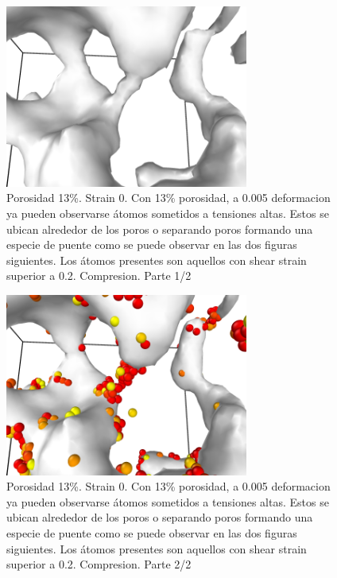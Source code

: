 \documentclass[10pt, oneside]{article} %
\begin{document}
\begin{figure}[H]
\centering
\includegraphics[width=8cm]{Figures/Porosidad/porosidad_13_0_puente.png}
\caption{Porosidad 13\%. Strain 0. Con 13\% porosidad, a 0.005 deformacion ya pueden observarse átomos sometidos a tensiones altas. Estos se ubican alrededor de los poros o separando poros formando una especie de puente como se puede observar en las dos figuras siguientes. Los átomos presentes son aquellos con shear strain superior a 0.2. Compresion. Parte 1/2}
\end{figure}

\begin{figure}[H]
\centering
\includegraphics[width=8cm]{Figures/Porosidad/porosidad_13_0005_puente.png}
\caption{Porosidad 13\%. Strain 0. Con 13\% porosidad, a 0.005 deformacion ya pueden observarse átomos sometidos a tensiones altas. Estos se ubican alrededor de los poros o separando poros formando una especie de puente como se puede observar en las dos figuras siguientes. Los átomos presentes son aquellos con shear strain superior a 0.2. Compresion. Parte 2/2}
\end{figure}
\end{document}
